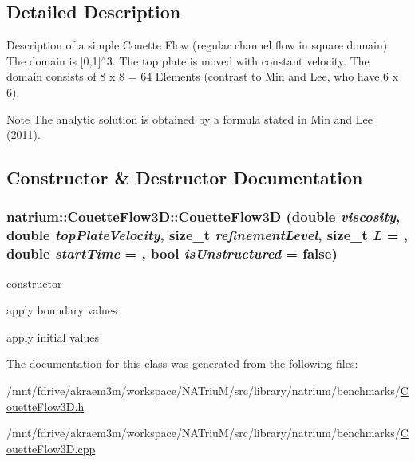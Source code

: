 \subsection{Detailed Description}
Description of a simple Couette Flow (regular channel flow in square domain). The domain is \mbox{[}0,1\mbox{]}$^\wedge$3. The top plate is moved with constant velocity. The domain consists of 8 x 8 = 64 Elements (contrast to Min and Lee, who have 6 x 6). \begin{DoxyNote}{Note}
The analytic solution is obtained by a formula stated in Min and Lee (2011). 
\end{DoxyNote}


\subsection{Constructor \& Destructor Documentation}
\hypertarget{classnatrium_1_1CouetteFlow3D_acf083268f4190ffe62b01f3dfc77d407}{
\subsubsection[{CouetteFlow3D}]{\setlength{\rightskip}{0pt plus 5cm}natrium::CouetteFlow3D::CouetteFlow3D (double {\em viscosity}, \/  double {\em topPlateVelocity}, \/  size\_\-t {\em refinementLevel}, \/  size\_\-t {\em L} = {}, \/  double {\em startTime} = {}, \/  bool {\em isUnstructured} = {\ttfamily false})}}
\label{classnatrium_1_1CouetteFlow3D_acf083268f4190ffe62b01f3dfc77d407}


constructor 

apply boundary values

apply initial values 

The documentation for this class was generated from the following files:\begin{DoxyCompactItemize}
\item 
/mnt/fdrive/akraem3m/workspace/NATriuM/src/library/natrium/benchmarks/\hyperlink{CouetteFlow3D_8h}{CouetteFlow3D.h}\item 
/mnt/fdrive/akraem3m/workspace/NATriuM/src/library/natrium/benchmarks/\hyperlink{CouetteFlow3D_8cpp}{CouetteFlow3D.cpp}\end{DoxyCompactItemize}
